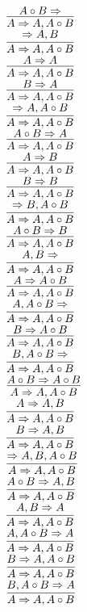 \documentclass[11pt]{article}
\begin{document}
\begin{center}
\bigskip
\\$\infer{A\Rightarrow A, A\circ B}{A\circ B\Rightarrow }$
\bigskip
\\$\infer{A\Rightarrow A, A\circ B}{\Rightarrow A, B}$
\bigskip
\\$\infer{A\Rightarrow A, A\circ B}{A\Rightarrow A}$
\bigskip
\\$\infer{A\Rightarrow A, A\circ B}{B\Rightarrow A}$
\bigskip
\\$\infer{A\Rightarrow A, A\circ B}{\Rightarrow A, A\circ B}$
\bigskip
\\$\infer{A\Rightarrow A, A\circ B}{A\circ B\Rightarrow A}$
\bigskip
\\$\infer{A\Rightarrow A, A\circ B}{A\Rightarrow B}$
\bigskip
\\$\infer{A\Rightarrow A, A\circ B}{B\Rightarrow B}$
\bigskip
\\$\infer{A\Rightarrow A, A\circ B}{\Rightarrow B, A\circ B}$
\bigskip
\\$\infer{A\Rightarrow A, A\circ B}{A\circ B\Rightarrow B}$
\bigskip
\\$\infer{A\Rightarrow A, A\circ B}{A, B\Rightarrow }$
\bigskip
\\$\infer{A\Rightarrow A, A\circ B}{A\Rightarrow A\circ B}$
\bigskip
\\$\infer{A\Rightarrow A, A\circ B}{A, A\circ B\Rightarrow }$
\bigskip
\\$\infer{A\Rightarrow A, A\circ B}{B\Rightarrow A\circ B}$
\bigskip
\\$\infer{A\Rightarrow A, A\circ B}{B, A\circ B\Rightarrow }$
\bigskip
\\$\infer{A\Rightarrow A, A\circ B}{A\circ B\Rightarrow A\circ B}$
\bigskip
\\$\infer{A\Rightarrow A, A\circ B}{A\Rightarrow A, B}$
\bigskip
\\$\infer{A\Rightarrow A, A\circ B}{B\Rightarrow A, B}$
\bigskip
\\$\infer{A\Rightarrow A, A\circ B}{\Rightarrow A, B, A\circ B}$
\bigskip
\\$\infer{A\Rightarrow A, A\circ B}{A\circ B\Rightarrow A, B}$
\bigskip
\\$\infer{A\Rightarrow A, A\circ B}{A, B\Rightarrow A}$
\bigskip
\\$\infer{A\Rightarrow A, A\circ B}{A, A\circ B\Rightarrow A}$
\bigskip
\\$\infer{A\Rightarrow A, A\circ B}{B\Rightarrow A, A\circ B}$
\bigskip
\\$\infer{A\Rightarrow A, A\circ B}{B, A\circ B\Rightarrow A}$
\bigskip

\end{center}
\end{document}
